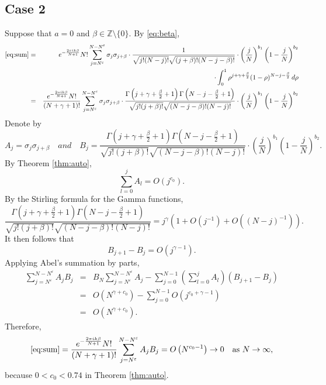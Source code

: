 \documentclass[12pt,reqno]{amsart}
\newcommand\ve{\varepsilon}
\newcommand\Z{\mathbb{Z}}
\theoremstyle{plain}
\theoremstyle{remark}
\numberwithin{equation}{section}
\begin{document}
\subsection{Case 2} 
Suppose that $a=0$ and $\beta\in\Z\setminus\{0\}$. By \eqref{eq:beta},
\begin{eqnarray*}
\eqref{eq:sum}&=&e^{-\frac{2\pi ik\beta}{N+1}}N!\sum_{j=N^\ve}^{N-N^\ve}\sigma_j\sigma_{j+\beta}\cdot\frac{1}{\sqrt{j!(N-j)!}\sqrt{(j+\beta)!(N-j-\beta)!}}\cdot\left(\frac jN\right)^{b_1}\left(1-\frac jN\right)^{b_2}\\
&&\cdot\int_0^1\rho^{j+\gamma+\frac\beta2}(1-\rho)^{N-j-\frac\beta2}\,d\rho\\
&=&\frac{e^{-\frac{2\pi ik\beta}{N+1}}N!}{(N+\gamma+1)!}\sum_{j=N^\ve}^{N-N^\ve}\sigma_j\sigma_{j+\beta}\cdot\frac{\Gamma\left(j+\gamma+\frac\beta2+1\right)\Gamma\left(N-j-\frac\beta2+1\right)}{\sqrt{j!(j+\beta)!}\sqrt{(N-j-\beta)!(N-j)!}}\cdot\left(\frac jN\right)^{b_1}\left(1-\frac jN\right)^{b_2}
\end{eqnarray*}
Denote by 
$$A_j=\sigma_j\sigma_{j+\beta}\quad{and}\quad B_j=\frac{\Gamma\left(j+\gamma+\frac\beta2+1\right)\Gamma\left(N-j-\frac\beta2+1\right)}{\sqrt{j!(j+\beta)!}\sqrt{(N-j-\beta)!(N-j)!}}\cdot\left(\frac jN\right)^{b_1}\left(1-\frac jN\right)^{b_2}.$$
By Theorem \ref{thm:auto}, 
$$\sum_{l=0}^jA_l=O\left(j^{c_0}\right).$$
By the Stirling formula for the Gamma functions,
$$\frac{\Gamma\left(j+\gamma+\frac\beta2+1\right)\Gamma\left(N-j-\frac\beta2+1\right)}{\sqrt{j!(j+\beta)!}\sqrt{(N-j-\beta)!(N-j)!}}=j^\gamma\left(1+O\left(j^{-1}\right)+O\left((N-j)^{-1}\right)\right).$$
It then follows that
$$B_{j+1}-B_j=O\left(j^{\gamma-1}\right).$$
Applying Abel's summation by parts, 
\begin{eqnarray*}
\sum_{j=N^\ve}^{N-N^\ve}A_jB_j&=&B_N\sum_{j=N^\ve}^{N-N^\ve}A_j-\sum_{j=0}^{N-1}\left(\sum_{l=0}^jA_l\right)\left(B_{j+1}-B_j\right)\\
&=&O\left(N^{\gamma+c_0}\right)-\sum_{j=0}^{N-1}O\left(j^{c_0+\gamma-1}\right)\\
&=&O\left(N^{\gamma+c_0}\right).
\end{eqnarray*}
Therefore,
$$\eqref{eq:sum}=\frac{e^{-\frac{2\pi ik\beta}{N+1}}N!}{(N+\gamma+1)!}\sum_{j=N^\ve}^{N-N^\ve}A_jB_j=O\left(N^{c_0-1}\right)\to0\quad\text{as }N\to\infty,$$
because $0<c_0<0.74$ in Theorem \ref{thm:auto}. 
\end{document}
